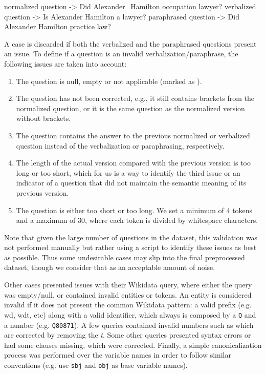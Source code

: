 \begin{sparqlcode}[%
    caption={Example of questions contained in one case of the \LCQuADtwo{} dataset.}, 
    label={lst:questionExampleLcquad2}]
normalized question  -> Did {Alexander_Hamilton} {occupation} {lawyer}?
verbalized question  -> Is Alexander Hamilton a lawyer?
paraphrased question -> Did Alexander Hamilton practice law?
\end{sparqlcode}

A case is discarded if both the verbalized and the paraphrased questions present an issue. To 
define if a question is an invalid verbalization/paraphrase, the following issues are taken 
into account:

\begin{enumerate}
    \item The question is null, empty or not applicable (marked as ). 
    \item The question has not been corrected, e.g., it still contains brackets from the normalized 
    question, or it is the same question as the normalized version without brackets.
    \item The question contains the answer to the previous normalized or verbalized question 
    instead of the verbalization or paraphrasing, respectively. 
    \item The length of the actual version compared with the previous version is too long or too 
    short, which for us is a way to identify the third issue or an indicator of a question that 
    did not maintain the semantic meaning of its previous version.
    \item The question is either too short or too long. We set a minimum of 4 tokens and a 
    maximum of 30, where each token is divided by whitespace characters.
\end{enumerate}

Note that given the large number of questions in the dataset, this validation was not performed 
manually but rather using a script to identify these issues as best as possible. Thus some 
undesirable cases may slip into the final preprocessed dataset, though we consider that as an 
acceptable amount of noise.

Other cases presented issues with their Wikidata \SPARQL{} query, where either the query was 
empty/null, or contained invalid entities or tokens. An entity is considered invalid if it does 
not present the common Wikidata pattern: a valid prefix (e.g. wd, wdt, etc) along with a valid 
identifier, which always is composed by a \texttt{Q} and a number (e.g. \texttt{Q80871}). A few 
queries contained invalid numbers such as  which are corrected by removing the 
\textit{t}. Some other queries presented syntax errors or had some clauses missing, which were 
corrected. Finally, a simple canonicalization process was performed over the variable names in 
order to follow similar conventions (e.g. use \texttt{sbj} and \texttt{obj} as base variable 
names).

